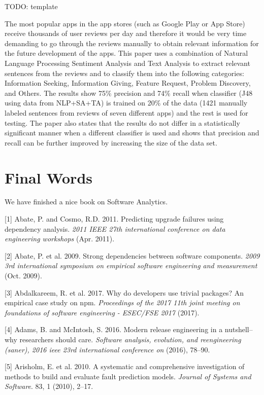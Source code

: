 \documentclass[]{book}
\begin{document}
TODO: template

The most popular apps in the app stores (such as Google Play or App
Store) receive thousands of user reviews per day and therefore it would
be very time demanding to go through the reviews manually to obtain
relevant information for the future development of the apps. This paper
uses a combination of Natural Language Processing Sentiment Analysis and
Text Analysis to extract relevant sentences from the reviews and to
classify them into the following categories: Information Seeking,
Information Giving, Feature Request, Problem Discovery, and Others. The
results show 75\% precision and 74\% recall when classifier (J48 using
data from NLP+SA+TA) is trained on 20\% of the data (1421 manually
labeled sentences from reviews of seven different apps) and the rest is
used for testing. The paper also states that the results do not differ
in a statistically significant manner when a different classifier is
used and shows that precision and recall can be further improved by
increasing the size of the data set.

\chapter{Final Words}\label{final-words}

We have finished a nice book on Software Analytics.

\hypertarget{refs}{}
\hypertarget{ref-Abate2011}{}
{[}1{]} Abate, P. and Cosmo, R.D. 2011. Predicting upgrade failures
using dependency analysis. \emph{2011 IEEE 27th international conference
on data engineering workshops} (Apr. 2011).

\hypertarget{ref-Abate2009}{}
{[}2{]} Abate, P. et al. 2009. Strong dependencies between software
components. \emph{2009 3rd international symposium on empirical software
engineering and measurement} (Oct. 2009).

\hypertarget{ref-Abdalkareem2017}{}
{[}3{]} Abdalkareem, R. et al. 2017. Why do developers use trivial
packages? An empirical case study on npm. \emph{Proceedings of the 2017
11th joint meeting on foundations of software engineering - ESEC/FSE
2017} (2017).

\hypertarget{ref-adams2016a}{}
{[}4{]} Adams, B. and McIntosh, S. 2016. Modern release engineering in a
nutshell--why researchers should care. \emph{Software analysis,
evolution, and reengineering (saner), 2016 ieee 23rd international
conference on} (2016), 78--90.

\hypertarget{ref-Arisholm2010}{}
{[}5{]} Arisholm, E. et al. 2010. A systematic and comprehensive
investigation of methods to build and evaluate fault prediction models.
\emph{Journal of Systems and Software}. 83, 1 (2010), 2--17.
\end{document}

